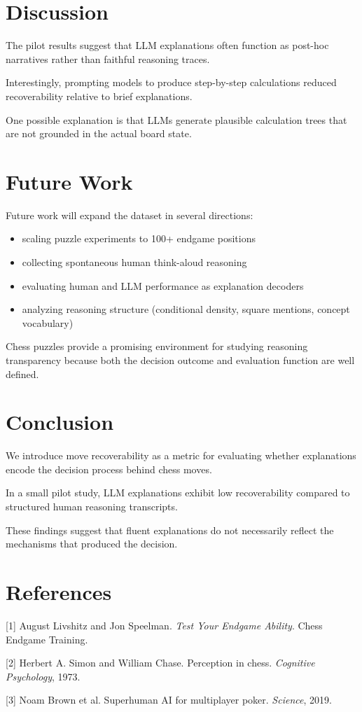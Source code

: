 \documentclass{article}
\begin{document}
\section{Discussion}

The pilot results suggest that LLM explanations often function as post-hoc narratives rather than faithful reasoning traces.

Interestingly, prompting models to produce step-by-step calculations reduced recoverability relative to brief explanations.

One possible explanation is that LLMs generate plausible calculation trees that are not grounded in the actual board state.

\section{Future Work}

Future work will expand the dataset in several directions:

\begin{itemize}
\item scaling puzzle experiments to 100+ endgame positions
\item collecting spontaneous human think-aloud reasoning
\item evaluating human and LLM performance as explanation decoders
\item analyzing reasoning structure (conditional density, square mentions, concept vocabulary)
\end{itemize}

Chess puzzles provide a promising environment for studying reasoning transparency because both the decision outcome and evaluation function are well defined.

\section{Conclusion}

We introduce move recoverability as a metric for evaluating whether explanations encode the decision process behind chess moves.

In a small pilot study, LLM explanations exhibit low recoverability compared to structured human reasoning transcripts.

These findings suggest that fluent explanations do not necessarily reflect the mechanisms that produced the decision.

\section*{References}

{\small

[1] August Livshitz and Jon Speelman. \textit{Test Your Endgame Ability}. Chess Endgame Training.

[2] Herbert A. Simon and William Chase. Perception in chess. \textit{Cognitive Psychology}, 1973.

[3] Noam Brown et al. Superhuman AI for multiplayer poker. \textit{Science}, 2019.

}
\end{document}
